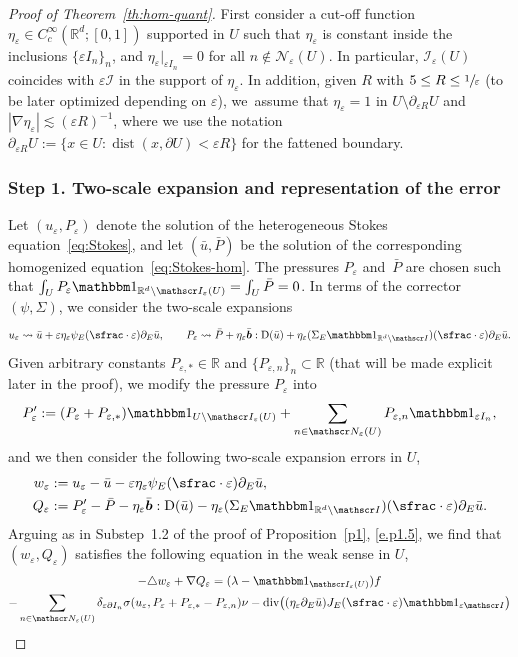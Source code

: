 \documentclass[JEP,XML,SOM,Unicode,published]{cedram}
\let\mathcal\mathscr
\let\mathds\mathbbm
\theoremstyle{plain}
\theoremstyle{definition}
\newcommand{\e}{\varepsilon}
\newcommand{\dist}{\operatorname{dist}}
\newcommand{\R}{\mathbb R}
\newcommand{\Ic}{\mathcal I}
\newcommand{\Nc}{\mathcal N}
\newcommand{\D}{\operatorname{D}}
\newcommand{\bb}{\bar{\boldsymbol b}}
\newcommand{\Div}{{\operatorname{div}}}
\newcommand{\step}[1]{\subsubsection*{Step #1}}
\begin{document}
\begin{proof}[Proof of Theorem~\ref{th:hom-quant}]
First consider a cut-off function $\eta_\e\in C^\infty_c(\R^d;[0,1])$ supported in $U$ such that $\eta_\e$ is constant inside the inclusions $\{\e I_n\}_n$, and $\eta_\e|_{\e I_n}=0$ for all $n\notin\Nc_\e(U)$. In particular, $\Ic_\e(U)$ coincides with $\e\Ic$ in the support of $\eta_\e$. In addition, given $R$ with $5\le R\le\sfrac1\e$ (to be later optimized depending on $\e$), we~assume that $\eta_\e=1$ in $U\setminus\partial_{\e R}U$ and $|\nabla\eta_\e|\lesssim(\e R)^{-1}$, where we use the notation \mbox{$\partial_{\e R}U:=\{x\in U:\dist(x,\partial U)<\e R\}$} for the fattened boundary.

\step{1. Two-scale expansion and representation of the error}
Let $(u_\e,P_\e)$ denote the solution of the heterogeneous Stokes equation~\eqref{eq:Stokes}, and let $(\bar u,\bar P)$ be the solution of the corresponding homogenized equation~\eqref{eq:Stokes-hom}.
The pressures $P_\e$ and~$\bar P$ are chosen such that $\int_{U}P_\e\mathds1_{\R^d\setminus\Ic_\e(U)}=\int_{U}\bar P=0$.
In terms of the corrector $(\psi,\Sigma)$, we consider the two-scale expansions
\[u_\e\leadsto\bar u+\e\eta_\e\psi_E(\sfrac\cdot\e)\partial_E\bar u,
\qquad P_\e\leadsto\bar P+\eta_\e\bb:\D(\bar u)+\eta_\e(\Sigma_E\mathds1_{\R^d\setminus\Ic})(\sfrac\cdot\e)\partial_E\bar u.\]
Given arbitrary constants $P_{\e,*}\in\R$ and $\{P_{\e,n}\}_n\subset\R$ (that will be made explicit later in the proof), we modify the pressure $P_\e$ into
\[P_\e':=(P_\e+P_{\e,*})\mathds1_{U\setminus\Ic_\e(U)}+\sum_{n\in\Nc_\e(U)}P_{\e,n}\mathds1_{\e I_n},\]
and we then consider the following two-scale expansion errors in $U$,
\begin{align*}
w_\e&:= u_\e-\bar u-\e\eta_\e\psi_E(\sfrac\cdot\e)\partial_E\bar u,\\
Q_\e&:= P_\e'-\bar P-\eta_\e\bb:\D(\bar u)-\eta_\e(\Sigma_E\mathds1_{\R^d\setminus\Ic})(\sfrac\cdot\e)\partial_E\bar u.
\end{align*}
Arguing as in Substep~1.2 of the proof of Proposition~\ref{p1}, \cf \eqref{e.p1.5},
we find that $(w_\e,Q_\e)$ satisfies the following equation in the weak sense in $U$,
\begin{multline}\label{eq:error-wPeps}
-\triangle w_\e+\nabla Q_\e=(\lambda-\mathds1_{\Ic_\e(U)})f\\
-\sum_{n\in\Nc_\e(U)}\delta_{\e\partial I_n}\sigma(u_\e,P_\e+P_{\e,*}-P_{\e,n})\nu
-\Div\big((\eta_\e\partial_E\bar u)J_E(\sfrac\cdot\e)\mathds1_{\e\Ic}\big)\\

\end{multline}
\end{proof}
\end{document}
